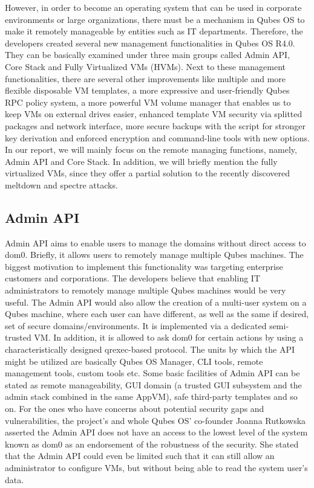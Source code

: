 \documentclass[runningheads,a4paper]{article}
\begin{document}
However, in order to become an operating system that can be used in
corporate environments or large organizations, there must be a mechanism in Qubes OS to make it remotely manageable by entities such
as IT departments.  Therefore, the developers created several new
management functionalities in Qubes OS R4.0. They can be basically
examined under three main groups called Admin API, Core Stack and Fully Virtualized VMs (HVMs). Next
to these management functionalities, there are several other
improvements like multiple and more flexible
disposable VM templates, a more expressive and user-friendly Qubes RPC
policy system, a more powerful VM volume manager that enables us to
keep VMs on external drives easier, enhanced template VM security via
splitted packages and network interface, more secure backups with
the script for stronger key derivation and enforced encryption and
command-line tools with new options. In our report, we will mainly
focus on the remote managing functions, namely, Admin API and Core
Stack. In addition, we will briefly mention the fully virtualized VMs,
since they offer a partial solution to the recently discovered
meltdown and spectre attacks.

\subsection{Admin API} 

Admin API aims to enable users to manage the
domains without direct access to dom0. Briefly, it allows users to
remotely manage multiple Qubes machines.  The biggest motivation to
implement this functionality was targeting enterprise customers
and corporations. The developers believe that enabling IT
administrators to remotely manage multiple Qubes machines would be
very useful.  The Admin API would also allow the creation of a
multi-user system on a Qubes machine, where each user can have
different, as well as the same if desired, set of secure
domains/environments.  It is implemented via a dedicated semi-trusted
VM. In addition, it is allowed to ask dom0 for certain actions by
using a characteristically designed qrexec-based protocol.  The units
by which the API might be utilized are basically Qubes OS Manager, CLI
tools, remote management tools, custom tools etc. Some basic
facilities of Admin API can be stated as remote manageability, GUI
domain (a trusted GUI subsystem and the admin stack combined in the
same AppVM), safe third-party templates and so on. For the ones who
have concerns about potential security gaps and vulnerabilities, the
project's and whole Qubes OS' co-founder Joanna Rutkowska asserted the
Admin API does not have an access to the lowest level of the system
known as dom0 as an endorsement of the robustness of the security. She
stated that the Admin API could even be limited such that it can still
allow an administrator to configure VMs, but without being able to
read the system user's data.
\end{document}
